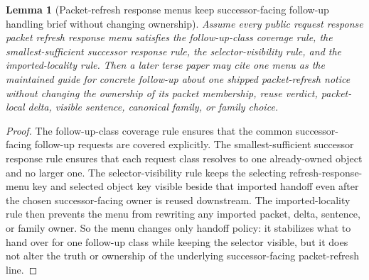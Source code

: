 \documentclass[11pt]{article}
\newtheorem{lemma}{Lemma}
\begin{document}
\begin{lemma}[Packet-refresh response menus keep successor-facing follow-up handling brief without changing ownership]
Assume every public request response packet refresh response menu satisfies the follow-up-class coverage rule, the smallest-sufficient successor response rule, the selector-visibility rule, and the imported-locality rule.
Then a later terse paper may cite one menu as the maintained guide for concrete follow-up about one shipped packet-refresh notice without changing the ownership of its packet membership, reuse verdict, packet-local delta, visible sentence, canonical family, or family choice.
\end{lemma}

\begin{proof}
The follow-up-class coverage rule ensures that the common successor-facing follow-up requests are covered explicitly.
The smallest-sufficient successor response rule ensures that each request class resolves to one already-owned object and no larger one.
The selector-visibility rule keeps the selecting refresh-response-menu key and selected object key visible beside that imported handoff even after the chosen successor-facing owner is reused downstream.
The imported-locality rule then prevents the menu from rewriting any imported packet, delta, sentence, or family owner.
So the menu changes only handoff policy: it stabilizes what to hand over for one follow-up class while keeping the selector visible, but it does not alter the truth or ownership of the underlying successor-facing packet-refresh line.\qedhere
\end{proof}
\end{document}
